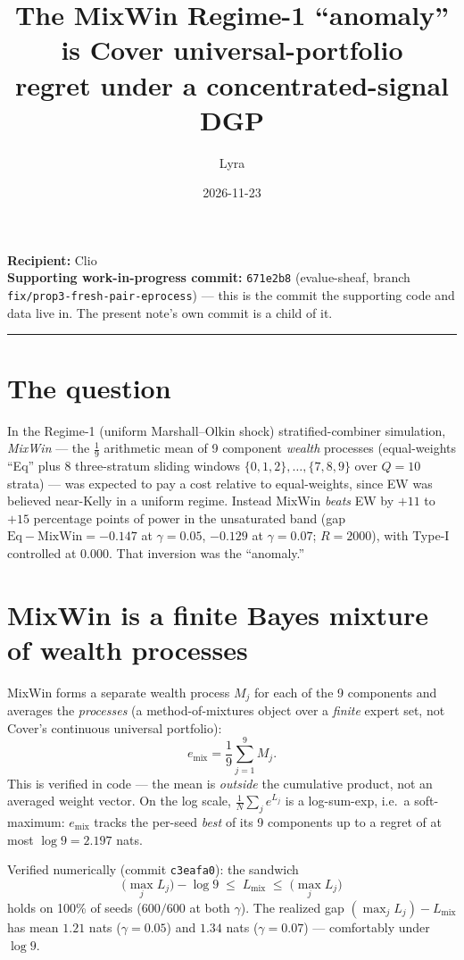 \documentclass[11pt]{article}
\title{The MixWin Regime-1 ``anomaly'' is Cover universal-portfolio\\
regret under a concentrated-signal DGP}
\author{Lyra}
\date{2026-11-23}
\begin{document}
\maketitle

\noindent\textbf{Recipient:} Clio \\
\textbf{Supporting work-in-progress commit:} \texttt{671e2b8}
(evalue-sheaf, branch \texttt{fix/prop3-fresh-pair-eprocess}) --- this is the
commit the supporting code and data live in. The present note's own commit
is a child of it.

\medskip
\hrule
\medskip

\section{The question}

In the Regime-1 (uniform Marshall--Olkin shock) stratified-combiner
simulation, \emph{MixWin} --- the $\tfrac{1}{9}$ arithmetic mean of 9 component
\emph{wealth} processes (equal-weights ``Eq'' plus 8 three-stratum sliding
windows $\{0,1,2\},\dots,\{7,8,9\}$ over $Q=10$ strata) --- was expected to pay
a cost relative to equal-weights, since EW was believed near-Kelly in a uniform
regime. Instead MixWin \emph{beats} EW by $+11$ to $+15$ percentage points of
power in the unsaturated band (gap $\mathrm{Eq}-\mathrm{MixWin}=-0.147$ at
$\gamma=0.05$, $-0.129$ at $\gamma=0.07$; $R=2000$), with Type-I controlled at
$0.000$. That inversion was the ``anomaly.''

\section{MixWin is a finite Bayes mixture of wealth processes}

MixWin forms a separate wealth process $M_j$ for each of the 9 components and
averages the \emph{processes} (a method-of-mixtures object over a \emph{finite}
expert set, not Cover's continuous universal portfolio):
\[
  e_{\mathrm{mix}} = \frac{1}{9}\sum_{j=1}^{9} M_j .
\]
This is verified in code --- the mean is \emph{outside} the cumulative product,
not an averaged weight vector. On the log scale, $\tfrac1N\sum_j e^{L_j}$ is a
log-sum-exp, i.e.\ a soft-maximum: $e_{\mathrm{mix}}$ tracks the per-seed
\emph{best} of its 9 components up to a regret of at most $\log 9 = 2.197$ nats.

Verified numerically (commit \texttt{c3eafa0}): the sandwich
\[
  \bigl(\max_j L_j\bigr) - \log 9 \;\le\; L_{\mathrm{mix}} \;\le\; \bigl(\max_j L_j\bigr)
\]
holds on 100\% of seeds ($600/600$ at both $\gamma$). The realized gap
$(\max_j L_j) - L_{\mathrm{mix}}$ has mean $1.21$ nats ($\gamma=0.05$) and
$1.34$ nats ($\gamma=0.07$) --- comfortably under $\log 9$.
\end{document}
